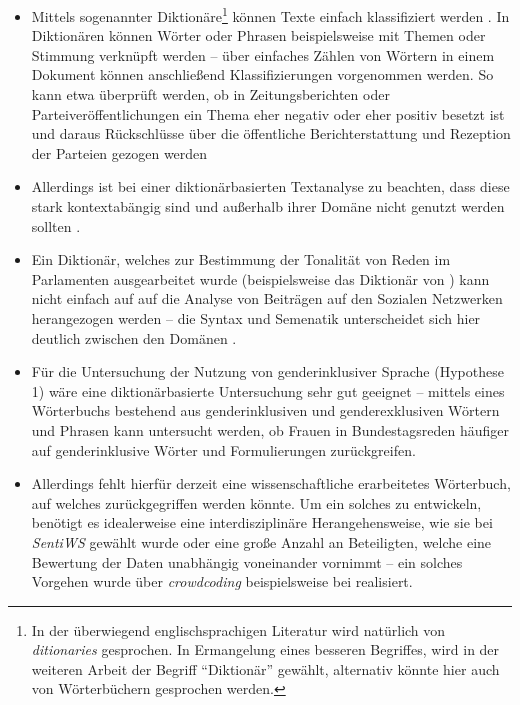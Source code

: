 \documentclass[12pt, 
    twoside=false, 
    bibliography=totoc, 
    numbers=endperiod, 
    headings=normal, 
    toc=chapterentrydotfill
    ]{scrbook}
\begin{document}
\begin{itemize}
    \item Mittels sogenannter Diktionäre\footnote{In der überwiegend englischsprachigen Literatur wird natürlich von \emph{ditionaries} gesprochen. In Ermangelung eines besseren Begriffes, wird in der weiteren Arbeit der Begriff \enquote{Diktionär} gewählt, alternativ könnte hier auch von Wörterbüchern gesprochen werden.} können Texte einfach klassifiziert werden \parencite[274]{grimmer_2013}. In Diktionären können Wörter oder Phrasen beispielsweise mit Themen oder Stimmung verknüpft werden -- über einfaches Zählen von Wörtern in einem Dokument können anschließend Klassifizierungen vorgenommen werden. So kann etwa überprüft werden, ob in Zeitungsberichten oder Parteiveröffentlichungen ein Thema eher negativ oder eher positiv besetzt ist und daraus Rückschlüsse über die öffentliche Berichterstattung und Rezeption der Parteien gezogen werden \parencites[vgl.][]{haselmayer_2017}[vgl.][]{backfried_2016} 
    \item Allerdings ist bei einer diktionärbasierten Textanalyse zu beachten, dass diese stark kontextabängig sind und außerhalb ihrer Domäne nicht genutzt werden sollten \parencite[268]{grimmer_2013}. 
    \item Ein Diktionär, welches zur Bestimmung der Tonalität von Reden im Parlamenten ausgearbeitet wurde (beispielsweise das Diktionär von \textcite{haselmayer_2017}) kann nicht einfach auf auf die Analyse von Beiträgen auf den Sozialen Netzwerken herangezogen werden -- die Syntax und Semenatik unterscheidet sich hier deutlich zwischen den Domänen \parencite[vgl.][534f.]{wilkerson_2017}.
    \item Für die Untersuchung der Nutzung von genderinklusiver Sprache (Hypothese 1) wäre eine diktionärbasierte Untersuchung sehr gut geeignet -- mittels eines Wörterbuchs bestehend aus genderinklusiven und genderexklusiven Wörtern und Phrasen kann untersucht werden, ob Frauen in Bundestagsreden häufiger auf genderinklusive Wörter und Formulierungen zurückgreifen. 
    \item Allerdings fehlt hierfür derzeit eine wissenschaftliche erarbeitetes Wörterbuch, auf welches zurückgegriffen werden könnte. Um ein solches zu entwickeln, benötigt es idealerweise eine interdisziplinäre Herangehensweise, wie sie bei \emph{SentiWS} \parencite{remus_sentiws_2010} gewählt wurde oder eine große Anzahl an Beteiligten, welche eine Bewertung der Daten unabhängig voneinander vornimmt -- ein solches Vorgehen wurde über \emph{crowdcoding} beispielsweise bei \textcite{haselmayer_2017} realisiert.

\end{itemize}
\end{document}
